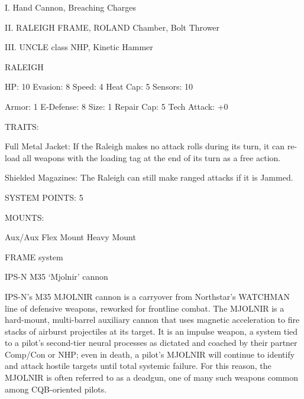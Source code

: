 I. Hand Cannon, Breaching Charges
 
II. RALEIGH FRAME, ROLAND Chamber, Bolt Thrower
 
III. UNCLE class NHP, Kinetic Hammer
 

                                                                                                                  


                                                    RALEIGH 

  HP: 10          Evasion: 8                              Speed: 4            Heat Cap: 5         Sensors: 10 

  Armor: 1        E-Defense: 8                            Size: 1             Repair Cap: 5       Tech Attack:  
                                                                                                  +0 

                                                      TRAITS: 

  Full Metal Jacket: If the Raleigh makes no attack rolls during its turn, it can re-load all weapons with  
  the loading tag at the end of its turn as a free action.
 
  Shielded Magazines: The Raleigh can still make ranged attacks if it is Jammed. 

                                               SYSTEM POINTS: 5 

                                                     MOUNTS: 

  Aux/Aux                             Flex Mount                              Heavy Mount 

                                                  FRAME system 

                                           IPS-N M35 ‘Mjolnir’ cannon  

  IPS-N’s M35 MJOLNIR cannon is a carryover from Northstar’s WATCHMAN line of defensive weapons,  
  reworked for frontline combat. The MJOLNIR is a hard-mount, multi-barrel auxiliary cannon that uses  
  magnetic acceleration to fire stacks of airburst projectiles at its target. It is an impulse weapon, a system  
  tied to a pilot’s second-tier neural processes as dictated and coached by their partner Comp/Con or  
  NHP; even in death, a pilot’s MJOLNIR will continue to identify and attack hostile targets until total  
  systemic failure. For this reason, the MJOLNIR is often referred to as a deadgun, one of many such  
  weapons common among CQB-oriented pilots.        


